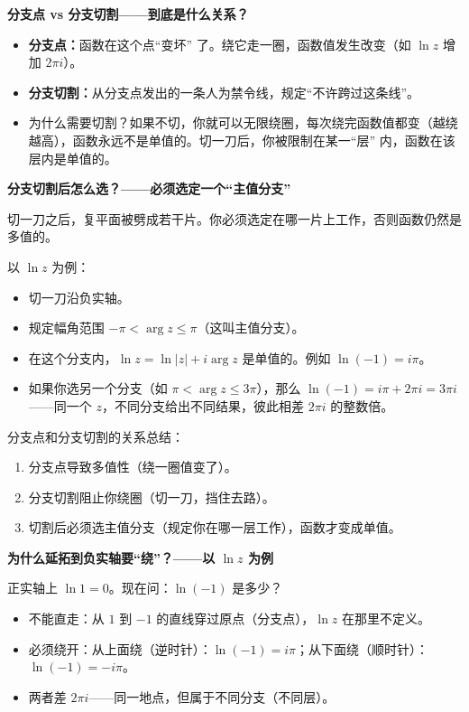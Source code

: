 \begin{derivationbox}[解析延拓与积分路径的选择]
\textbf{分支点 vs 分支切割——到底是什么关系？}
\begin{itemize}
    \item \textbf{分支点：}函数在这个点``变坏'' 了。绕它走一圈，函数值发生改变（如 $\ln z$ 增加 $2\pi i$）。
    \item \textbf{分支切割：}从分支点发出的一条人为禁令线，规定``不许跨过这条线''。
    \item 为什么需要切割？如果不切，你就可以无限绕圈，每次绕完函数值都变（越绕越高），函数永远不是单值的。切一刀后，你被限制在某一``层'' 内，函数在该层内是单值的。
\end{itemize}

\textbf{分支切割后怎么选？——必须选定一个``主值分支''}

切一刀之后，复平面被劈成若干片。你必须选定在哪一片上工作，否则函数仍然是多值的。

以 $\ln z$ 为例：
\begin{itemize}
    \item 切一刀沿负实轴。
    \item 规定幅角范围 $-\pi < \arg z \le \pi$（这叫主值分支）。
    \item 在这个分支内，$\ln z = \ln|z| + i\arg z$ 是单值的。例如 $\ln(-1) = i\pi$。
    \item 如果你选另一个分支（如 $\pi < \arg z \le 3\pi$），那么 $\ln(-1) = i\pi + 2\pi i = 3\pi i$——同一个 $z$，不同分支给出不同结果，彼此相差 $2\pi i$ 的整数倍。
\end{itemize}

分支点和分支切割的关系总结：
\begin{enumerate}
    \item 分支点导致多值性（绕一圈值变了）。
    \item 分支切割阻止你绕圈（切一刀，挡住去路）。
    \item 切割后必须选主值分支（规定你在哪一层工作），函数才变成单值。
\end{enumerate}

\textbf{为什么延拓到负实轴要``绕''？——以 $\ln z$ 为例}

正实轴上 $\ln 1 = 0$。现在问：$\ln(-1)$ 是多少？
\begin{itemize}
    \item 不能直走：从 $1$ 到 $-1$ 的直线穿过原点（分支点），$\ln z$ 在那里不定义。
    \item 必须绕开：从上面绕（逆时针）：$\ln(-1) = i\pi$；从下面绕（顺时针）：$\ln(-1) = -i\pi$。
    \item 两者差 $2\pi i$——同一地点，但属于不同分支（不同层）。
\end{itemize}


\end{derivationbox}
